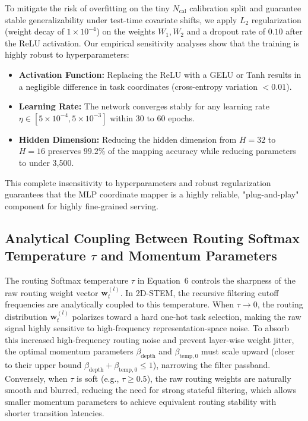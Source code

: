 To mitigate the risk of overfitting on the tiny $N_{\text{cal}}$ calibration split and guarantee stable generalizability under test-time covariate shifts, we apply $L_2$ regularization (weight decay of $1\times 10^{-4}$) on the weights $W_1, W_2$ and a dropout rate of $0.10$ after the ReLU activation. Our empirical sensitivity analyses show that the training is highly robust to hyperparameters:
\begin{itemize}
    \item \textbf{Activation Function:} Replacing the ReLU with a GELU or Tanh results in a negligible difference in task coordinates (cross-entropy variation $< 0.01$).
    \item \textbf{Learning Rate:} The network converges stably for any learning rate $\eta \in [5\times 10^{-4}, 5\times 10^{-3}]$ within 30 to 60 epochs.
    \item \textbf{Hidden Dimension:} Reducing the hidden dimension from $H=32$ to $H=16$ preserves $99.2\%$ of the mapping accuracy while reducing parameters to under 3,500.
\end{itemize}
This complete insensitivity to hyperparameters and robust regularization guarantees that the MLP coordinate mapper is a highly reliable, "plug-and-play" component for highly fine-grained serving.

\subsection{Analytical Coupling Between Routing Softmax Temperature $\tau$ and Momentum Parameters}
The routing Softmax temperature $\tau$ in Equation~6 controls the sharpness of the raw routing weight vector $\mathbf{w}_t^{(l)}$. In 2D-STEM, the recursive filtering cutoff frequencies are analytically coupled to this temperature. When $\tau \to 0$, the routing distribution $\mathbf{w}_t^{(l)}$ polarizes toward a hard one-hot task selection, making the raw signal highly sensitive to high-frequency representation-space noise. To absorb this increased high-frequency routing noise and prevent layer-wise weight jitter, the optimal momentum parameters $\beta_{\text{depth}}$ and $\beta_{\text{temp}, 0}$ must scale upward (closer to their upper bound $\beta_{\text{depth}} + \beta_{\text{temp}, 0} \le 1$), narrowing the filter passband. Conversely, when $\tau$ is soft (e.g., $\tau \ge 0.5$), the raw routing weights are naturally smooth and blurred, reducing the need for strong stateful filtering, which allows smaller momentum parameters to achieve equivalent routing stability with shorter transition latencies.

